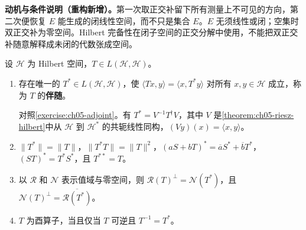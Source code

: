 \documentclass[../../main.tex]{subfiles}
\begin{document}
\begin{remark}
\textbf{动机与条件说明（重构新增）。}第一次取正交补留下所有测量上不可见的方向，第二次便恢复 $E$ 能生成的闭线性空间，而不只是集合 $E$。$E$ 无须线性或闭；空集时双正交补为零空间。Hilbert 完备性在闭子空间的正交分解中使用，不能把双正交补随意解释成未闭的代数张成空间。
\end{remark}
\begin{exercise}\label{exercise:ch05-hilbert-adjoint}
设 $\mathscr H$ 为 Hilbert 空间，$T\in L(\mathscr H,\mathscr H)$。
\begin{enumerate}
\item\label{item:ch05-hilbert-adjoint-existence}
\begin{definition*}\label{definition:ch05-hilbert-adjoint}
存在唯一的 $T^*\in L(\mathscr H,\mathscr H)$，使 $\langle Tx,y\rangle=\langle x,T^*y\rangle$ 对所有 $x,y\in\mathscr H$ 成立，称为 $T$ 的\textbf{伴随}。
\end{definition*}
对照\cref{exercise:ch05-adjoint}。有 $T^*=V^{-1}T^\dagger V$，其中 $V$ 是\cref{theorem:ch05-riesz-hilbert}中从 $\mathscr H$ 到 $\mathscr H^*$ 的共轭线性同构，$(Vy)(x)=\langle x,y\rangle$。
\item\label{item:ch05-hilbert-adjoint-identities} $\|T^*\|=\|T\|$，$\|T^*T\|=\|T\|^2$，$(aS+bT)^*=\overline aS^*+\overline bT^*$，$(ST)^*=T^*S^*$，且 $T^{**}=T$。
\item\label{item:ch05-hilbert-adjoint-range-kernel} 以 $\mathscr R$ 和 $\mathscr N$ 表示值域与零空间，则 $\mathscr R(T)^\perp=\mathscr N(T^*)$，且 $\mathscr N(T)^\perp=\overline{\mathscr R(T^*)}$。
\item\label{item:ch05-unitary-adjoint-inverse} $T$ 为酉算子，当且仅当 $T$ 可逆且 $T^{-1}=T^*$。
\end{enumerate}
\end{exercise}
\end{document}
